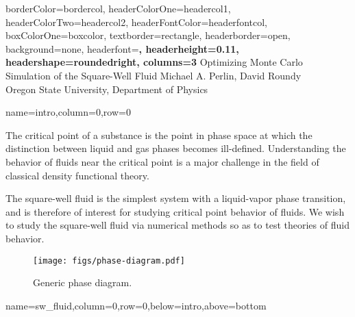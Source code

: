 \documentclass[paperwidth=48in,paperheight=36in,
fontscale=0.27,margin=0.75in]{baposter}
\renewcommand{\title}{Optimizing Monte Carlo Simulation of the
  Square-Well Fluid}
\renewcommand{\author}{\LARGE Michael A. Perlin, David Roundy}
\newcommand{\location}{Oregon State University, Department of Physics}
\begin{document}
\begin{poster}{
    borderColor=bordercol, %
    headerColorOne=headercol1, %
    headerColorTwo=headercol2, %
    headerFontColor=headerfontcol, %
    boxColorOne=boxcolor, %
    textborder=rectangle, %
    headerborder=open, %
    background=none, %
    headerfont=\Large\sf\bf, %
    headerheight=0.11\textheight, %
    headershape=roundedright, %
    columns=3 %
  }%
  {%
  }%
  {%
    \LARGE\title
  }%
  {%
    \Large\author \\[1mm]
    \location
  }%
  {%
  }%

  {name=intro,column=0,row=0}{%

    The critical point of a substance is the point in phase space at
    which the distinction between liquid and gas phases becomes
    ill-defined. Understanding the behavior of fluids near the
    critical point is a major challenge in the field of classical
    density functional theory.

    \vspace{6pt}

    The square-well fluid is the simplest system with a liquid-vapor
    phase transition, and is therefore of interest for studying
    critical point behavior of fluids. We wish to study the
    square-well fluid via numerical methods so as to test theories of
    fluid behavior.

    \begin{figure}[H]
      \centering
      \texttt{[image: figs/phase-diagram.pdf]}
      \caption{Generic phase diagram.}
      \label{fig:phase_diagram}
    \end{figure}

  }

  {name=sw_fluid,column=0,row=0,below=intro,above=bottom}{%



}
\end{poster}
\end{document}
